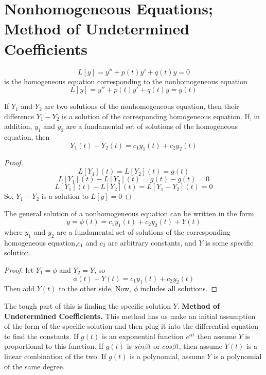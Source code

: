 \section{Nonhomogeneous Equations; Method of Undetermined Coefficients}
    \begin{equation*}
        L[y] = y'' + p(t)y' + q(t)y = 0
    \end{equation*}
    is the homogeneous equation corresponding to the nonhomogeneous equation
    \begin{equation*}
        L[y] = y'' + p(t)y' + q(t)y = g(t)
    \end{equation*}
    \begin{theorem}
        If $Y_1$ and $Y_2$ are two solutions of the nonhomogeneous equation, then their difference $Y_1 - Y_2$ is a solution of the corresponding homogeneous equation. If, in addition, $y_1$ and $y_2$ are a fundamental set of solutions of the homogeneous equation, then
        $$Y_1(t) - Y_2(t) = c_1y_1(t) + c_2y_2(t)$$
    \end{theorem}
    \begin{proof}
        $$L[Y_1](t) = L[Y_2](t) = g(t)$$
        $$L[Y_1](t) - L[Y_2](t) = g(t) - g(t) = 0$$ 
        $$L[Y_1](t) - L[Y_2](t) = L[Y_1 - Y_2](t) = 0$$ 
        So, $Y_1 - Y_2$ is a solution to $L[y] = 0$
    \end{proof}
    \begin{theorem}
        The general solution of a nonhomogeneous equation can be written in the form
        $$y = \phi(t) = c_1y_1(t) + c_2y_2(t) + Y(t)$$
        where $y_1$ and $y_2$ are a fundamental set of solutions of the corresponding homogeneous equation,$c_1$ and $c_2$ are arbitrary constants, and $Y$ is some specific solution. 
    \end{theorem}
    \begin{proof}
        let $Y_1 = \phi$ and $Y_2 = Y$, so 
        $$\phi(t) - Y(t) = c_1y_1(t) + c_2y_2(t)$$
        Then add $Y(t)$ to the other side. Now, $\phi$ includes all solutions.
    \end{proof}
    The tough part of this is finding the specific solution $Y$.
    \newline \newline
    \textbf{Method of Undetermined Coefficients.} This method has us make an initial assumption of the form of the specific solution and then plug it into the differential equation to find the constants. If $g(t)$ is an exponential function $e^{\alpha t}$ then assume $Y$ is proportional to this function. If $g(t)$ is $sin\beta t$ or $cos\beta t$, then assume $Y(t)$ is a linear combination of the two. If $g(t)$ is a polynomial, assume $Y$ is a polynomial of the same degree.
